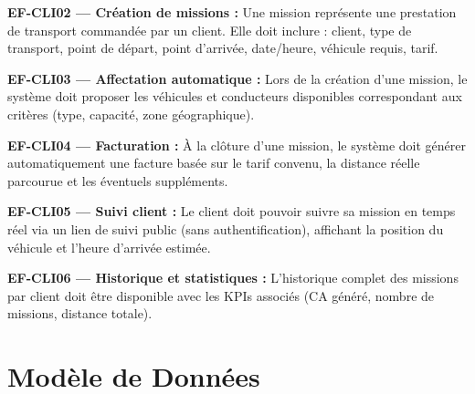 \documentclass[12pt,a4paper]{report}
\begin{document}
\begin{reqbox}
\textbf{EF-CLI02 — Création de missions :} Une mission représente une prestation de transport commandée par un client. Elle doit inclure : client, type de transport, point de départ, point d'arrivée, date/heure, véhicule requis, tarif.
\end{reqbox}

\begin{reqbox}
\textbf{EF-CLI03 — Affectation automatique :} Lors de la création d'une mission, le système doit proposer les véhicules et conducteurs disponibles correspondant aux critères (type, capacité, zone géographique).
\end{reqbox}

\begin{reqbox}
\textbf{EF-CLI04 — Facturation :} À la clôture d'une mission, le système doit générer automatiquement une facture basée sur le tarif convenu, la distance réelle parcourue et les éventuels suppléments.
\end{reqbox}

\begin{reqbox}
\textbf{EF-CLI05 — Suivi client :} Le client doit pouvoir suivre sa mission en temps réel via un lien de suivi public (sans authentification), affichant la position du véhicule et l'heure d'arrivée estimée.
\end{reqbox}

\begin{reqbox}
\textbf{EF-CLI06 — Historique et statistiques :} L'historique complet des missions par client doit être disponible avec les KPIs associés (CA généré, nombre de missions, distance totale).
\end{reqbox}

\section{Modèle de Données}
\end{document}
